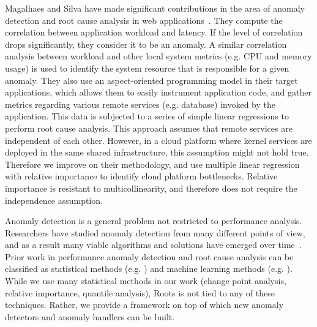 Magalhaes and Silva have made significant contributions in the area of anomaly detection
and root cause analysis in web applications~\cite{Magalhaes:2010:DPA:1906485.1906774, Magalhaes:2011:RAP:1982185.1982234}. 
They compute the correlation between application
workload and latency. If the level of correlation drops significantly, they consider it to be an
anomaly. A similar correlation analysis between workload and other local system metrics 
(e.g. CPU and memory usage) is used to identify the system resource that is responsible for
a given anomaly.
They also use an aspect-oriented programming model in their target applications, which
allows them to easily instrument application code, and gather metrics regarding various 
remote services (e.g. database) invoked by the application. This data is subjected to a 
series of simple linear regressions to perform root cause analysis. This approach assumes
that remote services are independent of each other. However, in a cloud platform where
kernel services are deployed in the same shared infrastructure, this assumption might not
hold true. Therefore we improve on their methodology, and use multiple linear regression
with relative importance to identify cloud platform bottlenecks. Relative importance
is resistant to multicollinearity, and therefore does not require the independence assumption.

Anomaly detection is a general problem not restricted to performance analysis. Researchers
have studied anomaly detection from many different points of view, and as a result many
viable algorithms and solutions have emerged over time~\cite{Chandola:2009:ADS:1541880.1541882}.
Prior work in performance anomaly detection and root cause analysis can be classified as statistical
methods (e.g. \cite{6311395,Malkowski:2007:BDU:1783374.1783389,Magalhaes:2011:RAP:1982185.1982234,Nguyen:2011:PPR:2038633.2038634}) 
and machine learning methods (e.g. \cite{Cohen:2004:CID:1251254.1251270,Yu:2013:SNA:2494621.2494643,bhaduri2011detecting}).
While we use many statistical methods
in our work (change point analysis, relative importance, quantile analysis), Roots is not tied to any of these
techniques. Rather, we provide a framework on top of which new anomaly detectors and anomaly
handlers can be built. 
